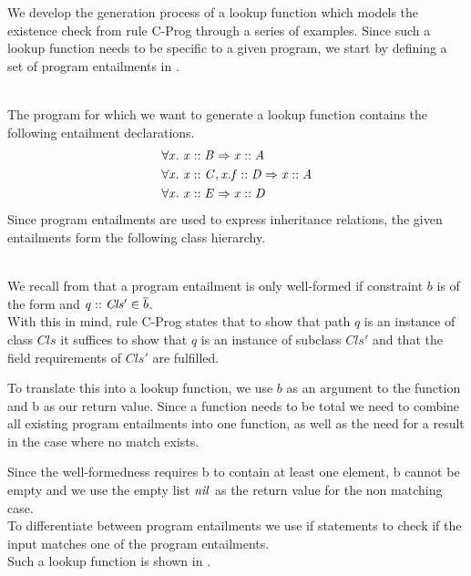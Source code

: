 We develop the generation process of a lookup function which models
the existence check from rule C-Prog through a series of examples.
Since such a lookup function needs to be specific to a given program,
we start by defining a set of program entailments in .
%
\begin{example}\quad\\
\label{ex:progent-inheritance}
The program for which we want to generate a lookup function
contains the following entailment declarations.
\begin{align*}
& \forall \mathit{x}.\ \mathit{\mathit{x} :: \mathit{B}} \Rightarrow \mathit{\mathit{x} :: \mathit{A}}\\
& \forall \mathit{x}.\ \mathit{\mathit{x} :: \mathit{C}, \mathit{x.f} :: \mathit{D}} \Rightarrow \mathit{\mathit{x} :: \mathit{A}}\\
& \forall \mathit{x}.\ \mathit{\mathit{x} :: \mathit{E}} \Rightarrow \mathit{\mathit{x} :: \mathit{D}}
\end{align*}
Since program entailments are used to express inheritance relations,
the given entailments form the following class hierarchy.
\begin{center}
\end{center}
\end{example}\quad\\
We recall from  that a program entailment 
is only well-formed if constraint $b$ is
of the form  and $\mathit{q} :: \mathit{Cls'} \in \overline{b}$.\\
With this in mind, rule C-Prog states that to show that
path $q$ is an instance of class $Cls$ it suffices to show
that $q$ is an instance of subclass $Cls'$
and that the field requirements of $Cls'$ are fulfilled.

To translate this into a lookup function,
we use $b$ as an argument to the function and \ovl b as our return value.
Since a function needs to be total we need to combine all
existing program entailments into one function,
as well as the need for a result in the case where no match exists.

Since the well-formedness requires \ovl b to contain at least
one element, \ovl b cannot be empty and we use the
empty list $\mathit{nil}$ as the return value for the non matching case.\\
To differentiate between program entailments we use if statements
to check if the input matches one of the program entailments.\\
Such a lookup function is shown in .

